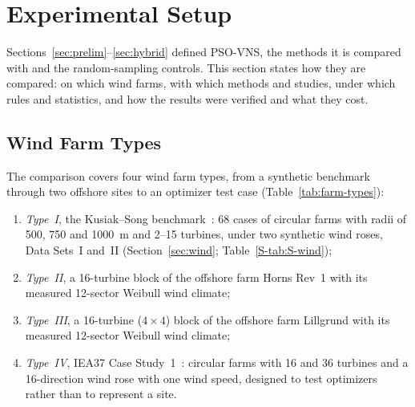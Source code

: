 \section{Experimental Setup}
\label{sec:setup}
Sections~\ref{sec:prelim}--\ref{sec:hybrid} defined PSO-VNS, the methods it is compared with and the random-sampling controls. This section states how they are compared: on which wind farms, with which methods and studies, under which rules and statistics, and how the results were verified and what they cost.

\subsection{Wind Farm Types}
\label{sec:setup-cases}
\label{sec:setup-beyond}
The comparison covers four wind farm types, from a synthetic benchmark through two offshore sites to an optimizer test case (Table~\ref{tab:farm-types}):
\begin{enumerate}
\item \emph{Type~I}, the Kusiak--Song benchmark~\cite{Kusiak2010,Bansal2017}: 68 cases of circular farms with radii of 500, 750 and 1000~m and 2--15 turbines, under two synthetic wind roses, Data Sets~I and~II (Section~\ref{sec:wind}; Table~\ref{S-tab:S-wind});
\item \emph{Type~II}, a 16-turbine block of the offshore farm Horns Rev~1 with its measured 12-sector Weibull wind climate;
\item \emph{Type~III}, a 16-turbine ($4\times4$) block of the offshore farm Lillgrund with its measured 12-sector Weibull wind climate;
\item \emph{Type~IV}, IEA37 Case Study~1~\cite{Baker2019,IEA37repo}: circular farms with 16 and 36 turbines and a 16-direction wind rose with one wind speed, designed to test optimizers rather than to represent a site.
\end{enumerate}

